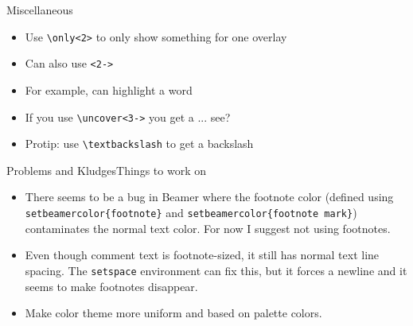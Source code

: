 %
%



\begin{frame}[c]{Miscellaneous}
	\begin{itemize}
		\item Use \texttt{\textbackslash only<2>} to only show something for one overlay
		\item Can also use \texttt{<2->}
		\item For example, can  highlight a word
		\item If you use \texttt{\textbackslash uncover<3->} you get a  ... see?
		\item Protip: use \texttt{\textbackslash textbackslash} to get a backslash
	\end{itemize}
\end{frame}



\begin{frame}[c]{Problems and Kludges}{Things to work on}
	\begin{itemize}
		\item There seems to be a bug in Beamer where the footnote color (defined using \texttt{setbeamercolor\{footnote\}} and \texttt{setbeamercolor\{footnote mark\}}) contaminates the normal text color. For now I suggest not using footnotes. 
		\item Even though comment text is footnote-sized, it still has normal text line spacing. The \texttt{setspace} environment can fix this, but it forces a newline and it seems to make footnotes disappear.
		\item Make color theme more uniform and based on palette colors.
	\end{itemize}
\end{frame}


